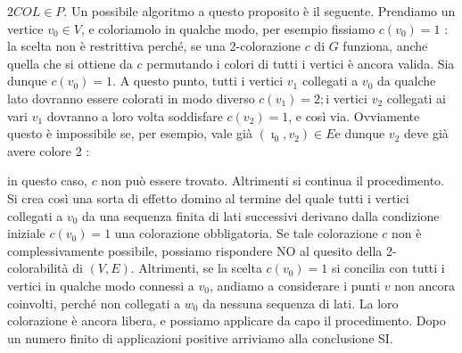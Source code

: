 \begin{enumerate}
          $2 C O L \in P$. Un possibile algoritmo a questo proposito è il seguente.
          Prendiamo un vertice $v_0 \in V$, e coloriamolo in qualche modo, per esempio
          fissiamo $c\left(v_0\right)=1$ : la scelta non è restrittiva perché, se una
          2-colorazione $c$ di $G$ funziona, anche quella che si ottiene da $c$ permutando
          i colori di tutti i vertici è ancora valida. Sia dunque $c\left(v_0\right)=1$. A
          questo punto, tutti i vertici $v_1$ collegati a $v_0$ da qualche lato dovranno
          essere colorati in modo diverso $c\left(v_1\right)=2 ; \mathrm{i}$ vertici $v_2$
          collegati ai vari $v_1$ dovranno a loro volta soddisfare $c\left(v_2\right)=1$,
          e così via. Ovviamente questo è impossibile se, per esempio, vale già
          $\left(\imath_0, v_2\right) \in E \mathrm{e}$ dunque $v_2$ deve già avere colore
          2 :

          \begin{center}
          \end{center}
          in questo caso, $c$ non può essere trovato. Altrimenti si continua il
          procedimento. Si crea così una sorta di effetto domino al termine del quale
          tutti i vertici collegati a $v_0$ da una sequenza finita di lati successivi
          derivano dalla condizione iniziale $c\left(v_0\right)=1$ una colorazione
          obbligatoria. Se tale colorazione $c$ non è complessivamente possibile, possiamo
          rispondere $\mathrm{NO}$ al quesito della 2-colorabilità di $(V, E)$.
          Altrimenti, se la scelta $c\left(v_0\right)=1$ si concilia con tutti i vertici
          in qualche modo connessi a $v_0$, andiamo a considerare i punti $v$ non ancora
          coinvolti, perché non collegati a $w_0$ da nessuna sequenza di lati. La loro
          colorazione è ancora libera, e possiamo applicare da capo il procedimento. Dopo
          un numero finito di applicazioni positive arriviamo alla conclusione SI.
\end{enumerate}
